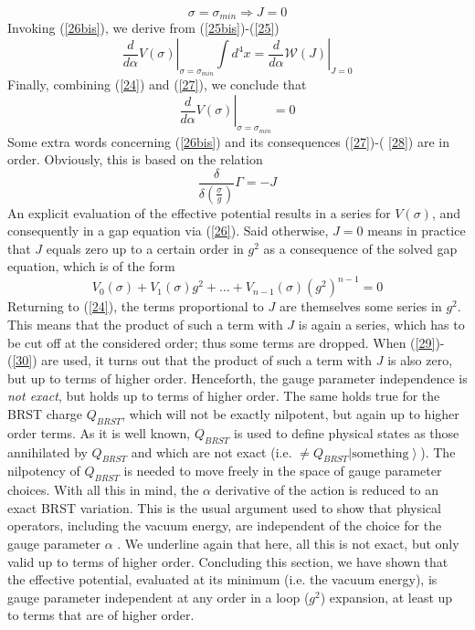 \documentclass[a4paper,12pt]{article}
\newcommand{\text}{\textrm}
\begin{document}
\begin{equation}  \label{26bis}
\sigma=\sigma_{min} \Rightarrow J=0
\end{equation}
Invoking (\ref{26bis}), we derive from (\ref{25bis})-(\ref{25})
\begin{equation}  \label{27}
\left.\frac{d}{d\alpha}V(\sigma)\right|_{\sigma=\sigma_{min}}\int d^{4}x=
\left.\frac{d}{d\alpha}\mathcal{W}(J)\right|_{J=0}
\end{equation}
Finally, combining (\ref{24}) and (\ref{27}), we conclude that
\begin{equation}  \label{28}
\left.\frac{d}{d\alpha}V(\sigma)\right|_{\sigma=\sigma_{min}}=0
\end{equation}
Some extra words concerning (\ref{26bis}) and its consequences (\ref{27})-(%
\ref{28}) are in order. Obviously, this is based on the relation
\begin{equation}  \label{29}
\frac{\delta}{\delta\left(\frac{\sigma}{g}\right)}\Gamma=-J
\end{equation}
An explicit evaluation of the effective potential results in a series for $%
V(\sigma)$, and consequently in a gap equation via (\ref{26}). Said otherwise, $J=0$ means in practice that $J$ equals zero up to a certain order in $%
g^{2}$ as a consequence of the solved gap equation, which is of the form
\begin{equation}  \label{30}
V_{0}(\sigma)+V_{1}(\sigma)g^{2}+\ldots+V_{n-1}(\sigma)\left(g^{2}%
\right)^{n-1}=0
\end{equation}
Returning to (\ref{24}), the terms proportional to $J$ are themselves some
series in $g^{2}$. This means that the product of such a term with $J$ is
again a series, which has to be cut off at the considered order; thus some
terms are dropped. When (\ref{29})-(\ref{30}) are used, it turns out that
the product of such a term with $J$ is also zero, but up to terms of higher
order. Henceforth, the gauge parameter independence is \emph{not exact}, but
holds up to terms of higher order. The same holds true for the BRST charge $%
Q_{BRST}$, which will not be exactly nilpotent, but again up to higher order
terms. As it is well known, $Q_{BRST}$ is used to define physical states as
those annihilated by $Q_{BRST}$ and which are not exact (i.e. $\neq
Q_{BRST}\left|\text{something}\right\rangle$). The nilpotency of $Q_{BRST}$
is needed to move freely in the space of gauge parameter choices. With all
this in mind, the $\alpha$ derivative of the action is reduced to an exact
BRST variation. This is the usual argument used to show that physical
operators, including the vacuum energy, are independent of the choice for
the gauge parameter $\alpha$ \cite{book}. We underline again that here, all
this is not exact, but only valid up to terms of higher order. \newline
\newline
Concluding this section, we have shown that the effective potential,
evaluated at its minimum (i.e. the vacuum energy), is gauge parameter
independent at any order in a loop ($g^{2}$) expansion, at least up to terms
that are of higher order.
\end{document}
